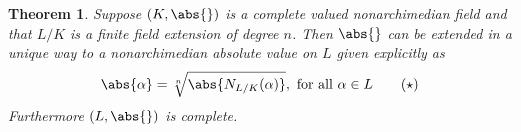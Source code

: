 \documentclass{article}
\newtheorem{theorem}{Theorem}[section]
\begin{document}
\begin{theorem}\label{thm: Extension of absolute value}
    Suppose $(K, \abs{})$ is a complete valued nonarchimedian field and that $L/K$ is a finite field extension of degree $n$. Then $\abs{}$ can be extended in a unique way to a nonarchimedian absolute value on $L$ given explicitly as
    \begin{equation}\label{eq: Extended absolute value}
        \abs{\alpha} = \sqrt[n]{\abs{N_{L/K}(\alpha)}}, \text{ for all } \alpha \in L\tag{$\star$}
    \end{equation}
    Furthermore $(L, \abs{})$ is complete. 
\end{theorem}
\end{document}
